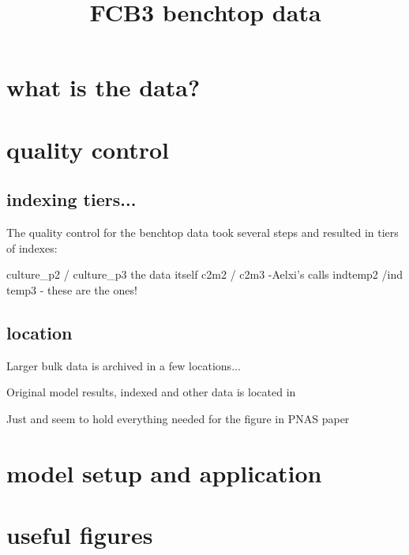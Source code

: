 \documentclass[11pt]{article}
\title{FCB3 benchtop data}
\begin{document}
\maketitle
\section{what is the data?}
\section{quality control}
\subsection{indexing tiers...}

The quality control for the benchtop data took several steps and resulted in tiers of indexes:

culture_p2 / culture_p3 the data itself
c2m2 / c2m3 -Aelxi's calls
indtemp2 /ind temp3 - these are the ones!
\subsection{location}

Larger bulk data is archived in a few locations...

Original model results, indexed and other data is located in 

Just  and  seem to hold everything needed for the figure in PNAS paper

\section{model setup and application}
\section{useful figures}
\end{document}
